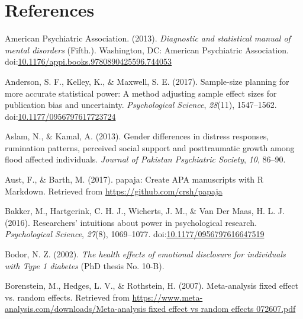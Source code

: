 \documentclass[man, mask]{apa6}
\theoremstyle{definition}
\theoremstyle{definition}
\theoremstyle{definition}
\theoremstyle{remark}
\begin{document}
\newpage

\section{References}\label{references}

\setlength{\parindent}{-0.5in} \setlength{\leftskip}{0.5in}

\hypertarget{refs}{}
\hypertarget{ref-AmericanPsychiatricAssociation2013}{}
American Psychiatric Association. (2013). \emph{Diagnostic and
statistical manual of mental disorders} (Fifth.). Washington, DC:
American Psychiatric Association.
doi:\href{https://doi.org/10.1176/appi.books.9780890425596.744053}{10.1176/appi.books.9780890425596.744053}

\hypertarget{ref-Anderson2017a}{}
Anderson, S. F., Kelley, K., \& Maxwell, S. E. (2017). Sample-size
planning for more accurate statistical power: A method adjusting sample
effect sizes for publication bias and uncertainty. \emph{Psychological
Science}, \emph{28}(11), 1547--1562.
doi:\href{https://doi.org/10.1177/0956797617723724}{10.1177/0956797617723724}

\hypertarget{ref-Aslam2013}{}
Aslam, N., \& Kamal, A. (2013). Gender differences in distress
responses, rumination patterns, perceived social support and
posttraumatic growth among flood affected individuals. \emph{Journal of
Pakistan Psychiatric Society}, \emph{10}, 86--90.

\hypertarget{ref-Aust2017}{}
Aust, F., \& Barth, M. (2017). papaja: Create APA manuscripts with R
Markdown. Retrieved from \url{https://github.com/crsh/papaja}

\hypertarget{ref-Bakker2016}{}
Bakker, M., Hartgerink, C. H. J., Wicherts, J. M., \& Van Der Maas, H.
L. J. (2016). Researchers' intuitions about power in psychological
research. \emph{Psychological Science}, \emph{27}(8), 1069--1077.
doi:\href{https://doi.org/10.1177/0956797616647519}{10.1177/0956797616647519}

\hypertarget{ref-Bodor2002}{}
Bodor, N. Z. (2002). \emph{The health effects of emotional disclosure
for individuals with Type 1 diabetes} (PhD thesis No. 10-B).

\hypertarget{ref-Borenstein2007}{}
Borenstein, M., Hedges, L. V., \& Rothstein, H. (2007). Meta-analysis
fixed effect vs. random effects. Retrieved from
\href{https://www.meta-analysis.com/downloads/Meta-analysis\%20fixed\%20effect\%20vs\%20random\%20effects\%20072607.pdf}{https://www.meta-analysis.com/downloads/Meta-analysis fixed effect vs random effects 072607.pdf}
\end{document}
